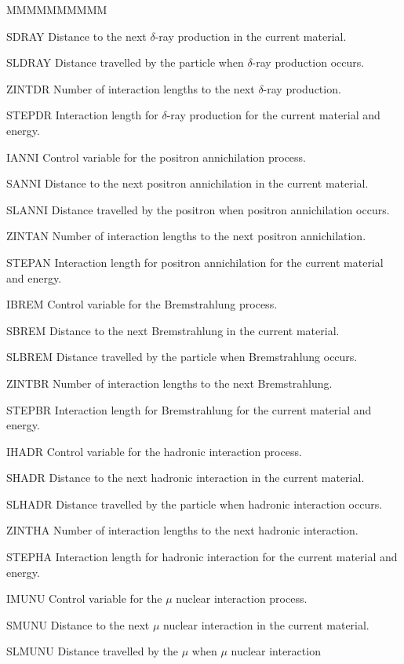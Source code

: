 \begin{DLtt}{MMMMMMMMMM}
\item[SDRAY] Distance to the next $\delta$-ray production in the current material.
\item[SLDRAY] Distance travelled by the particle when $\delta$-ray production 
occurs.
\item[ZINTDR] Number of interaction lengths to the next $\delta$-ray production.
\item[STEPDR] Interaction length for $\delta$-ray production for the current 
material and energy.
\item[IANNI] Control variable for the positron annichilation process.
\item[SANNI] Distance to the next positron annichilation in the current material.
\item[SLANNI] Distance travelled by the positron when positron annichilation 
occurs.
\item[ZINTAN] Number of interaction lengths to the next positron annichilation.
\item[STEPAN] Interaction length for positron annichilation for the current 
material and energy.
\item[IBREM] Control variable for the Bremstrahlung process.
\item[SBREM] Distance to the next Bremstrahlung in the current material.
\item[SLBREM] Distance travelled by the particle when Bremstrahlung occurs.
\item[ZINTBR] Number of interaction lengths to the next Bremstrahlung.
\item[STEPBR] Interaction length for Bremstrahlung for the current material
and energy.
\item[IHADR] Control variable for the hadronic interaction process.
\item[SHADR] Distance to the next hadronic interaction in the current material.
\item[SLHADR] Distance travelled by the particle when hadronic interaction occurs.
\item[ZINTHA] Number of interaction lengths to the next hadronic interaction.
\item[STEPHA] Interaction length for hadronic interaction for the current material
and energy.
\item[IMUNU] Control variable for the $\mu$ nuclear interaction process.
\item[SMUNU] Distance to the next $\mu$ nuclear interaction in the current 
material.
\item[SLMUNU] Distance travelled by the $\mu$ when $\mu$ nuclear interaction 

\end{DLtt}

